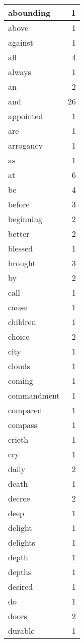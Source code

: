 \begin{center}
\begin{longtable}{l|r}
abounding & 1\\ \hline 
above & 1\\ \hline 
against & 1\\ \hline 
all & 4\\ \hline 
always & 1\\ \hline 
an & 2\\ \hline 
and & 26\\ \hline 
appointed & 1\\ \hline 
are & 1\\ \hline 
arrogancy & 1\\ \hline 
as & 1\\ \hline 
at & 6\\ \hline 
be & 4\\ \hline 
before & 3\\ \hline 
beginning & 2\\ \hline 
better & 2\\ \hline 
blessed & 1\\ \hline 
brought & 3\\ \hline 
by & 2\\ \hline 
call & 1\\ \hline 
cause & 1\\ \hline 
children & 1\\ \hline 
choice & 2\\ \hline 
city & 1\\ \hline 
clouds & 1\\ \hline 
coming & 1\\ \hline 
commandment & 1\\ \hline 
compared & 1\\ \hline 
compass & 1\\ \hline 
crieth & 1\\ \hline 
cry & 1\\ \hline 
daily & 2\\ \hline 
death & 1\\ \hline 
decree & 2\\ \hline 
deep & 1\\ \hline 
delight & 1\\ \hline 
delights & 1\\ \hline 
depth & 1\\ \hline 
depths & 1\\ \hline 
desired & 1\\ \hline 
do & 1\\ \hline 
doors & 2\\ \hline 
durable & 1\\ \hline 

\end{longtable}
\end{center}
